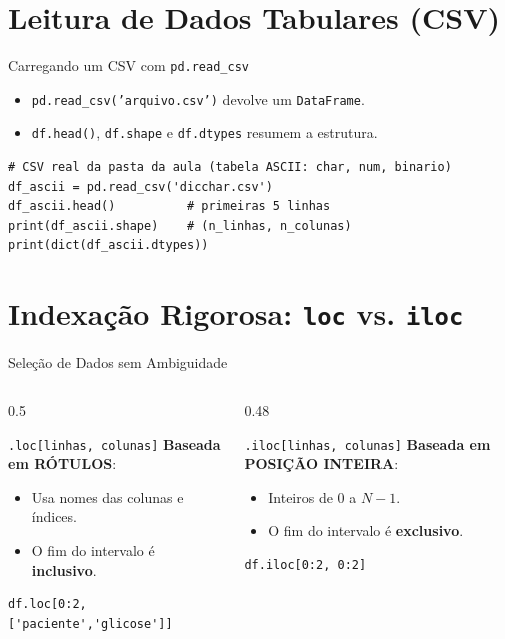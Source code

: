 \documentclass[aspectratio=169, 10pt]{beamer}
\begin{document}
\section{Leitura de Dados Tabulares (CSV)}

\begin{frame}[fragile]{Carregando um CSV com \texttt{pd.read\_csv}}
  \begin{itemize}
    \item \texttt{pd.read\_csv('arquivo.csv')} devolve um \texttt{DataFrame}.
    \item \texttt{df.head()}, \texttt{df.shape} e \texttt{df.dtypes} resumem a estrutura.
  \end{itemize}
  \begin{lstlisting}
# CSV real da pasta da aula (tabela ASCII: char, num, binario)
df_ascii = pd.read_csv('dicchar.csv')
df_ascii.head()          # primeiras 5 linhas
print(df_ascii.shape)    # (n_linhas, n_colunas)
print(dict(df_ascii.dtypes))
  \end{lstlisting}
\end{frame}

\section{Indexação Rigorosa: \texttt{loc} vs. \texttt{iloc}}

\begin{frame}[fragile]{Seleção de Dados sem Ambiguidade}
  \begin{columns}
    \begin{column}{0.5\textwidth}
      \begin{block}{\texttt{.loc[linhas, colunas]}}
        \textbf{Baseada em RÓTULOS}:
        \begin{itemize}
          \item Usa nomes das colunas e índices.
          \item O fim do intervalo é \textbf{inclusivo}.
        \end{itemize}
      \end{block}
      \begin{lstlisting}
df.loc[0:2, ['paciente','glicose']]
      \end{lstlisting}
    \end{column}
    \begin{column}{0.48\textwidth}
      \begin{block}{\texttt{.iloc[linhas, colunas]}}
        \textbf{Baseada em POSIÇÃO INTEIRA}:
        \begin{itemize}
          \item Inteiros de $0$ a $N-1$.
          \item O fim do intervalo é \textbf{exclusivo}.
        \end{itemize}
      \end{block}
      \begin{lstlisting}
df.iloc[0:2, 0:2]
      \end{lstlisting}
    \end{column}
  \end{columns}
\end{frame}
\end{document}

